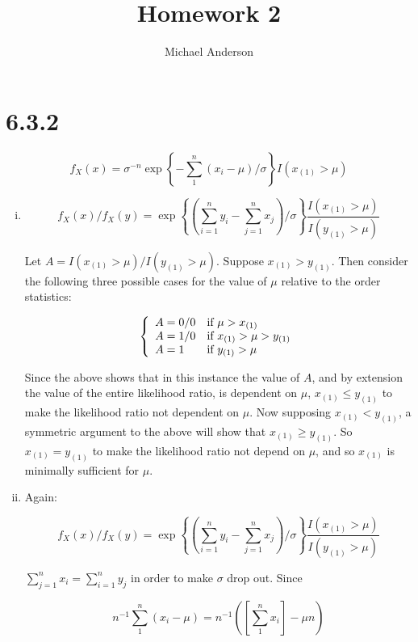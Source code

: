 \documentclass{article}
\author{Michael Anderson}
\title{Homework 2}
\begin{document}
\setlength{\parskip}{1em}
\maketitle
{}
\flushleft

\section{6.3.2}

\[
f_X(x) = \sigma^{-n} \exp \left\{-\sum_1^n (x_i-\mu)/\sigma \right\}
I(x_{(1)}>\mu)
\]

\begin{enumerate}[(i)]

\item
\[
f_X(x)/f_X(y) = \exp \left\{ \left( \sum_{i=1}^n y_i - \sum_{j=1}^n x_j \right)
/\sigma \right\}
\frac{I(x_{(1)}>\mu)}{I(y_{(1)}>\mu)}
\]

Let $A = I(x_{(1)}>\mu)/I(y_{(1)}>\mu)$. Suppose $x_{(1)} > y_{(1)}$.
Then consider the following three possible cases for the value of $\mu$
relative to the order statistics:

\[
\left\{ \begin{array}{l l}
A = 0/0 & \text{if } \mu > x_{(1)} \\
A = 1/0 & \text{if } x_{(1)} > \mu > y_{(1)} \\
A = 1 & \text{if } y_{(1)} > \mu \\
\end{array} \right.
\]

Since the above shows that in this instance the value of $A$,
and by extension the value of the entire likelihood
ratio, is dependent on $\mu$, $x_{(1)} \le y_{(1)}$ to make the likelihood
ratio not dependent on $\mu$. Now supposing $x_{(1)} < y_{(1)}$, a symmetric
argument to the above will show
that $x_{(1)} \ge y_{(1)}$. So $x_{(1)} = y_{(1)}$ to make the likelihood
ratio not depend on $\mu$, and so $x_{(1)}$ is minimally sufficient for
$\mu$. 

\item

Again:

\[
f_X(x)/f_X(y) = \exp \left\{ \left( \sum_{i=1}^n y_i - \sum_{j=1}^n x_j \right)
/\sigma \right\}
\frac{I(x_{(1)}>\mu)}{I(y_{(1)}>\mu)}
\]

$\sum_{j=1}^n x_i = \sum_{i=1}^n y_j$ in order to make $\sigma$ drop out.
Since

\[
n^{-1} \sum_1^n (x_i-\mu) = n^{-1} 
\left( \left[\sum_1^n x_i\right] - \mu n \right)
\]


\end{enumerate}
\end{document}

